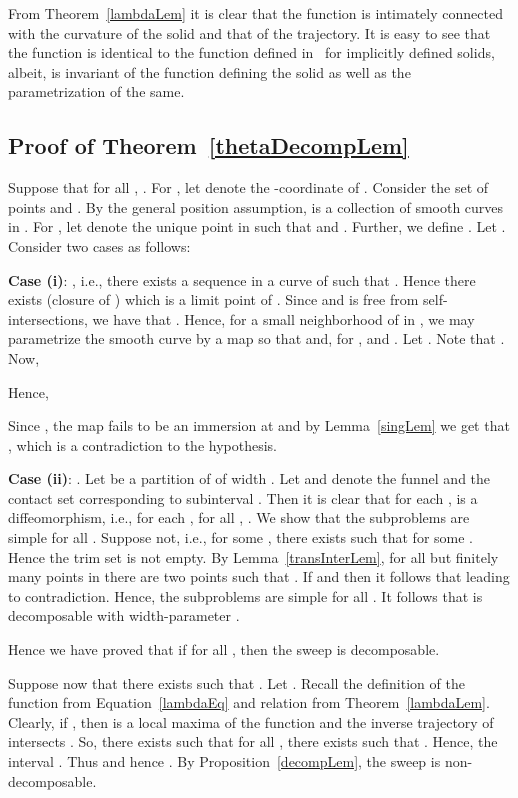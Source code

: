 \documentclass{elsart5p}
\begin{document}
From Theorem~\ref{lambdaLem}  it is clear that the function  is
intimately connected with the curvature of the solid and that of the trajectory. 
It is easy to see that the function  is identical to the function 
 defined in~\cite{trimming} for implicitly defined solids, albeit, is invariant of the function defining the solid 
as well as the parametrization of the same.

\subsection{Proof of Theorem~\ref{thetaDecompLem}}  \label{proofSec}
  Suppose that for all , .  
For , let  denote the -coordinate of .  
Consider the set of points 
 and .
By the general position assumption,  is a collection of smooth curves in .
For , let  denote the unique point in  such that  and 
.
Further, we define . 
Let .
Consider two cases as follows:

{\bf Case (i)}: , i.e., there exists a sequence  in a curve  of  such that
. Hence there exists  
(closure of )  which is a limit point of .  Since  and  is free from self-intersections, 
we have that . 
Hence, for a small neighborhood  of  in ,
we may parametrize the smooth curve 
 by a map  so that  and, for , 
 and .  
Let .  Note that . Now, 


Hence, 

Since , 
the map  fails to be an immersion at  
and by Lemma~\ref{singLem} we get that , which is a contradiction to the hypothesis.

{\bf Case (ii)}: .
Let  be a partition of  of width .  Let  and  
denote the funnel and the contact set corresponding to subinterval .  Then it is clear that for each ,
 is a diffeomorphism, i.e., for each ,
 for all , . 
We show that the subproblems  are simple for all .  Suppose not, i.e., 
for some , there exists  such that  for some 
.  Hence the trim set  is not empty.  By Lemma~\ref{transInterLem}, for all but finitely 
many points in 
  there are two points  such 
that .  If  and  then 
it follows that  leading to contradiction.
Hence, the subproblems  are simple for all .  
It follows that  is decomposable with width-parameter .


Hence we have proved that if for all ,  then the sweep is decomposable.


Suppose now that there exists  such that .  Let .  
Recall the definition of the function  from Equation~\ref{lambdaEq} and relation 
 from Theorem~\ref{lambdaLem}.  Clearly, if ,  
then  is a local maxima of the function  and the inverse trajectory of  intersects 
.
So, there exists  such that for all , 
there exists  such that .  
Hence, the interval .  Thus  and hence .
By Proposition~\ref{decompLem}, the sweep is non-decomposable.
\hfill 
\end{document}
